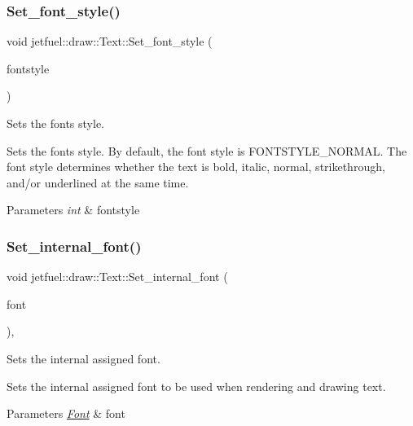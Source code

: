\subsubsection{\texorpdfstring{Set\+\_\+font\+\_\+style()}{Set\_font\_style()}}
{\footnotesize\ttfamily void jetfuel\+::draw\+::\+Text\+::\+Set\+\_\+font\+\_\+style (\begin{DoxyParamCaption}\item[{const int}]{fontstyle }\end{DoxyParamCaption})\hspace{0.3cm}{\ttfamily [inline]}}



Sets the font\textquotesingle{}s style. 

Sets the font\textquotesingle{}s style. By default, the font style is F\+O\+N\+T\+S\+T\+Y\+L\+E\+\_\+\+N\+O\+R\+M\+AL. The font style determines whether the text is bold, italic, normal, strikethrough, and/or underlined at the same time.


\begin{DoxyParams}{Parameters}
{\em int} & fontstyle \\
\hline
\end{DoxyParams}
\mbox{\label{classjetfuel_1_1draw_1_1Text_ae52e5068a74da2daaa78fffeed5e4dc3}} 
\subsubsection{\texorpdfstring{Set\+\_\+internal\+\_\+font()}{Set\_internal\_font()}}
{\footnotesize\ttfamily void jetfuel\+::draw\+::\+Text\+::\+Set\+\_\+internal\+\_\+font (\begin{DoxyParamCaption}\item[{\hyperlink{classjetfuel_1_1draw_1_1Font}{Font}}]{font }\end{DoxyParamCaption})\hspace{0.3cm}{\ttfamily [inline]}, {\ttfamily [protected]}}



Sets the internal assigned font. 

Sets the internal assigned font to be used when rendering and drawing text.


\begin{DoxyParams}{Parameters}
{\em \hyperlink{classjetfuel_1_1draw_1_1Font}{Font}} & font \\
\hline
\end{DoxyParams}
\mbox{\label{classjetfuel_1_1draw_1_1Text_a62bbae5ffafd2dbc327b79719c84d253}} 
